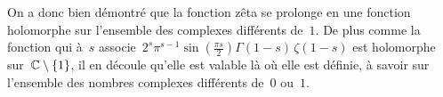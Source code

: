 \begin{dem}
			On a donc bien démontré que la fonction zêta se prolonge en une fonction holomorphe sur l'ensemble des complexes différents de~$1$. De plus comme la fonction qui à~$s$ associe~$2^s \pi^{s-1} \sin\left( \frac{\pi s}{2} \right) \Gamma(1-s)\, \zeta(1-s)$ est holomorphe sur~$\mathbb{C}\setminus\{1\}$, il en découle qu'elle est valable là où elle est définie, à savoir sur l'ensemble des nombres complexes différents de~$0$ ou~$1$.
		\end{dem}
		
		\Tbreak